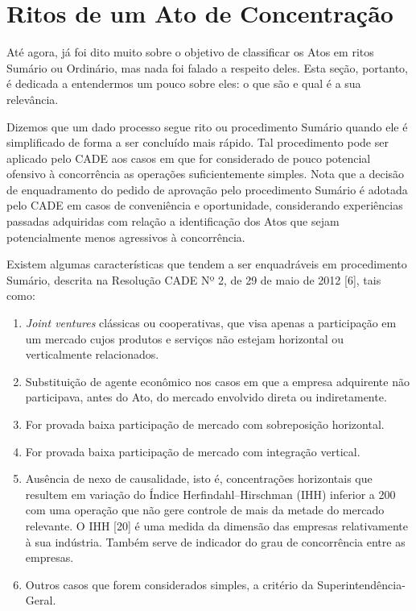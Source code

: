 \documentclass[11pt]{report}
\begin{document}
\section{Ritos de um Ato de Concentração}

\indent\indent Até agora, já foi dito muito sobre o objetivo de classificar os Atos em ritos Sumário ou Ordinário, mas nada foi falado a respeito deles. Esta seção, portanto,
é dedicada a entendermos um pouco sobre eles: o que são e  qual é a sua relevância.

\indent Dizemos que um dado processo segue rito ou procedimento Sumário quando ele é simplificado de forma a ser concluído mais rápido. Tal procedimento pode ser
aplicado pelo CADE aos casos em que for considerado de pouco potencial ofensivo à concorrência as operações suficientemente simples. Nota que a decisão de enquadramento do pedido
de aprovação pelo procedimento Sumário é adotada pelo CADE em casos de conveniência e oportunidade, considerando experiências passadas adquiridas com relação a identificação
dos Atos que sejam potencialmente menos agressivos à concorrência.

Existem algumas características que tendem a ser enquadráveis em procedimento Sumário, descrita na Resolução CADE Nº 2, de 29 de maio de 2012 [6], tais como:

\begin{enumerate}[label=\textbf{\Roman*.}]
\item \textit{Joint ventures} clássicas ou cooperativas, que visa apenas a participação em um mercado cujos produtos e serviços não
estejam horizontal ou verticalmente relacionados.
\item Substituição de agente econômico nos casos em que a empresa adquirente não participava, antes do Ato, do mercado envolvido direta ou indiretamente.
\item For provada baixa participação de mercado com sobreposição horizontal.
\item For provada baixa participação de mercado com integração vertical.
\item Ausência de nexo de causalidade, isto é, concentrações horizontais que resultem em variação do Índice Herfindahl–Hirschman (IHH) inferior a 200 com uma operação que não gere controle de mais da metade do mercado relevante. O IHH [20] é uma medida da dimensão das empresas relativamente à sua indústria. Também serve de indicador do grau de concorrência entre as empresas.
\item Outros casos que forem considerados simples, a critério da Superintendência-Geral.
\end{enumerate}
\end{document}
